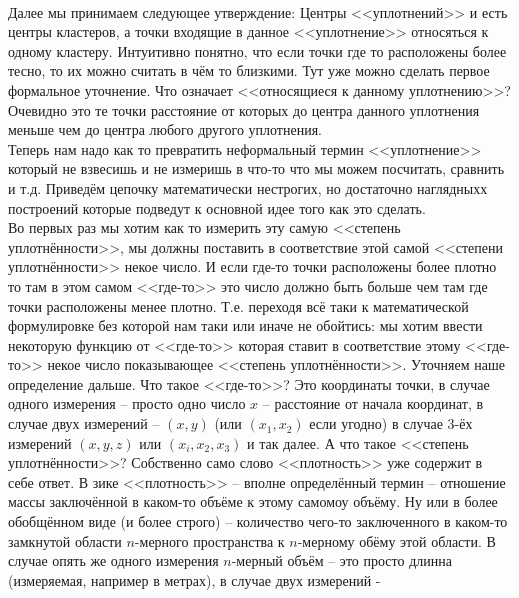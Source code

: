 \documentclass[11pt]{article}
\begin{document}
    \begin{center}
    \end{center}
    { \hspace*{\fill} \\}
    
    Далее мы принимаем следующее утверждение: Центры
<<уплотнений>> и есть центры кластеров, а точки входящие в данное
<<уплотнение>> относяться к одному кластеру. Интуитивно понятно,
что если точки где то расположены более тесно, то их можно считать в чём
то близкими. Тут уже можно сделать первое формальное уточнение. Что
означает <<относящиеся к данному уплотнению>>? Очевидно это те
точки расстояние от которых до центра данного уплотнения меньше чем до
центра любого другого уплотнения. \\ Теперь нам надо как то
превратить неформальный термин <<уплотнение>> который не взвесишь и
не измеришь в что-то что мы можем посчитать, сравнить и т.д. Приведём
цепочку математически нестрогих, но достаточно наглядныхх построений
которые подведут к основной идее того как это сделать.
\\ Во первых раз мы хотим как то измерить эту самую
<<степень уплотнённости>>, мы должны поставить в соответствие этой
самой <<степени уплотнённости>> некое число. И если где-то точки
расположены более плотно то там в этом самом <<где-то>> это число
должно быть больше чем там где точки расположены менее плотно. Т.е.
переходя всё таки к математической формулировке без которой нам таки или
иначе не обойтись: мы хотим ввести некоторую функцию от <<где-то>>
которая ставит в соответствие этому <<где-то>> некое число
показывающее <<степень уплотнённости>>. Уточняем наше определение
дальше. Что такое <<где-то>>? Это координаты точки, в случае одного
измерения -- просто одно число $x$ -- расстояние от начала координат, в
случае двух измерений -- $(x, y)$ (или $(x_1, x_2)$ если угодно) в случае
3-ёх измерений $(x, y, z)$ или $(x_i, x_2, x_3)$ и так далее. А что
такое <<степень уплотнённости>>? Собственно само слово
<<плотность>> уже содержит в себе ответ. В зике
<<плотность>> -- вполне определённый термин -- отношение массы
заключённой в каком-то объёме к этому самомоу объёму. Ну или в более
обобщённом виде (и более строго) -- количество чего-то заключенного в
каком-то замкнутой области $n$-мерного пространства к $n$-мерному обёму
этой области. В случае опять же одного измерения $n$-мерный объём -- это
просто длинна (измеряемая, например в метрах), в случае двух измерений -
\end{document}
